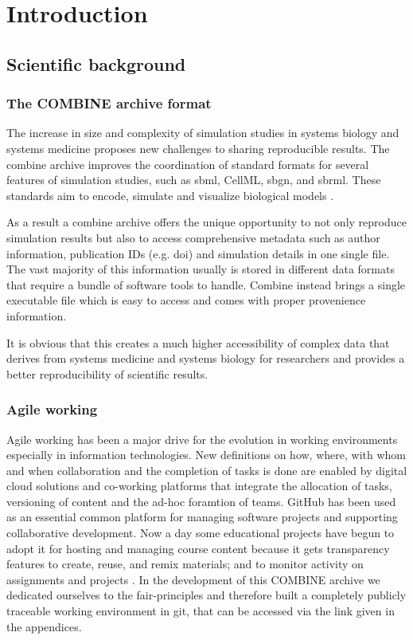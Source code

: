 \section*{Introduction}


\subsection*{Scientific background}
\subsubsection*{The COMBINE archive format}
The increase in size and complexity of simulation studies in systems biology and systems medicine proposes new challenges to sharing reproducible results. The \ac{combine} archive improves the coordination of standard formats for several features of simulation studies, such as \ac{sbml}, CellML, \ac{sbgn}, and \ac{sbrml}. These standards aim to encode, simulate and visualize biological models \cite{combine}. 

As a result a \ac{combine} archive offers the unique opportunity to not only reproduce simulation results but also to access comprehensive metadata such as author information, publication IDs (e.g. \ac{doi}) and simulation details in one single file. The vast majority of this information usually  is stored in different data formats that require a bundle of software tools to handle. Combine instead brings a single executable file which is easy to access and comes with proper provenience information.

It is obvious that this creates a much higher accessibility of complex data that derives from systems medicine and systems biology for researchers and provides a better reproducibility of scientific results.

\subsubsection*{Agile working}
Agile working has been a major drive for the evolution in working environments especially in information technologies. New definitions on how, where, with whom and when collaboration and the completion of tasks is done are enabled by digital cloud solutions and co-working platforms that integrate the allocation of tasks, versioning of content and the ad-hoc foramtion of teams. GitHub has been used as an essential common platform for managing software projects and supporting collaborative development. Now a day some educational projects have begun to adopt it for hosting and managing course content because it gets transparency features to create, reuse, and remix materials; and to monitor activity on assignments and projects \cite{github}. In the development of this COMBINE archive we dedicated ourselves to the \ac{fair}-principles and therefore built a completely publicly traceable working environment in git, that can be accessed via the link given in the appendices.




